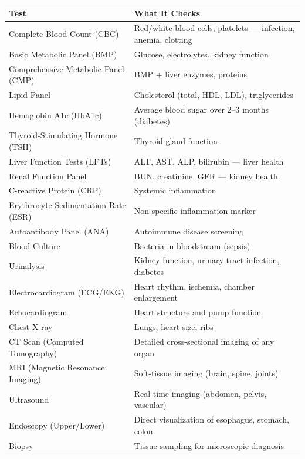 \begin{tabularx}{\textwidth}{lX}
\toprule
\textbf{Test} & \textbf{What It Checks} \\
\midrule
Complete Blood Count (CBC)   & Red/white blood cells, platelets --- infection, anemia, clotting \\
Basic Metabolic Panel (BMP)  & Glucose, electrolytes, kidney function \\
Comprehensive Metabolic Panel (CMP) & BMP + liver enzymes, proteins \\
Lipid Panel                  & Cholesterol (total, HDL, LDL), triglycerides \\
Hemoglobin A1c (HbA1c)       & Average blood sugar over 2--3 months (diabetes) \\
Thyroid-Stimulating Hormone (TSH) & Thyroid gland function \\
Liver Function Tests (LFTs)  & ALT, AST, ALP, bilirubin --- liver health \\
Renal Function Panel         & BUN, creatinine, GFR --- kidney health \\
C-reactive Protein (CRP)     & Systemic inflammation \\
Erythrocyte Sedimentation Rate (ESR) & Non-specific inflammation marker \\
Autoantibody Panel (ANA)     & Autoimmune disease screening \\
Blood Culture                & Bacteria in bloodstream (sepsis) \\
Urinalysis                   & Kidney function, urinary tract infection, diabetes \\
Electrocardiogram (ECG/EKG)  & Heart rhythm, ischemia, chamber enlargement \\
Echocardiogram               & Heart structure and pump function \\
Chest X-ray                  & Lungs, heart size, ribs \\
CT Scan (Computed Tomography) & Detailed cross-sectional imaging of any organ \\
MRI (Magnetic Resonance Imaging) & Soft-tissue imaging (brain, spine, joints) \\
Ultrasound                   & Real-time imaging (abdomen, pelvis, vascular) \\
Endoscopy (Upper/Lower)      & Direct visualization of esophagus, stomach, colon \\
Biopsy                       & Tissue sampling for microscopic diagnosis \\
\bottomrule
\end{tabularx}

